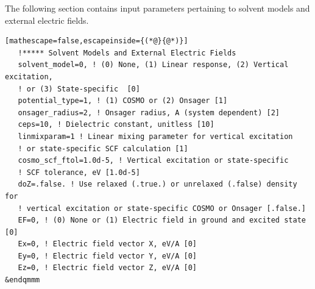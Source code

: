 \documentclass[letterpaper,12pt,titlepage]{article}
\begin{document}
\noindent The following section contains input parameters pertaining to solvent models and external electric fields.
\begin{lstlisting}[mathescape=false,escapeinside={(*@}{@*)}]
   !***** Solvent Models and External Electric Fields
   solvent_model=0, ! (0) None, (1) Linear response, (2) Vertical excitation, 
   ! or (3) State-specific  [0]
   potential_type=1, ! (1) COSMO or (2) Onsager [1]
   onsager_radius=2, ! Onsager radius, A (system dependent) [2]
   ceps=10, ! Dielectric constant, unitless [10]
   linmixparam=1 ! Linear mixing parameter for vertical excitation 
   ! or state-specific SCF calculation [1]
   cosmo_scf_ftol=1.0d-5, ! Vertical excitation or state-specific 
   ! SCF tolerance, eV [1.0d-5]
   doZ=.false. ! Use relaxed (.true.) or unrelaxed (.false) density for 
   ! vertical excitation or state-specific COSMO or Onsager [.false.]
   EF=0, ! (0) None or (1) Electric field in ground and excited state [0]
   Ex=0, ! Electric field vector X, eV/A [0]
   Ey=0, ! Electric field vector Y, eV/A [0]
   Ez=0, ! Electric field vector Z, eV/A [0] 
&endqmmm
\end{lstlisting}
\end{document}
